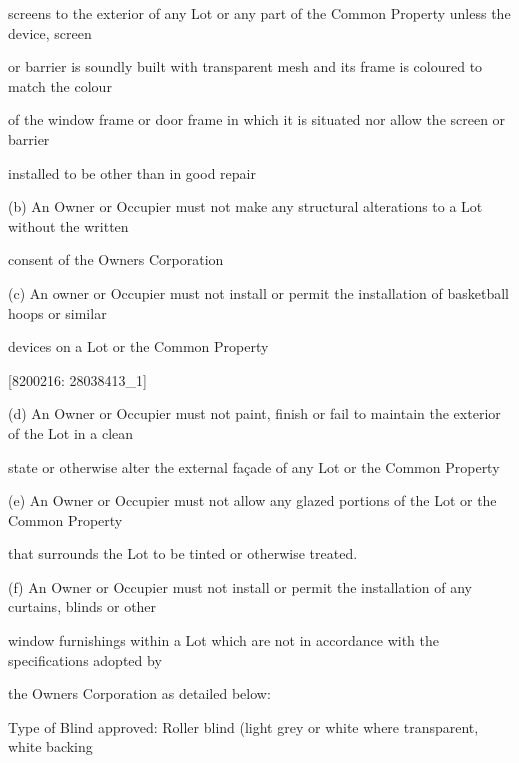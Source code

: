 \documentclass{article}
\begin{document}
{\fontsize{10.02}{1}screens to the exterior of any Lot or any part of the Common Property unless the device, screen }

{\fontsize{10.02}{1}or barrier is soundly built with transparent mesh and its frame is coloured to match the colour }

{\fontsize{10.02}{1}of the window frame or door frame in which it is situated nor allow the screen or barrier }

{\fontsize{10.02}{1}installed to be other than in good repair }

{\fontsize{9.962}{1}(b) An Owner or Occupier must not make any structural alterations to a Lot without the written }

{\fontsize{10.02}{1}consent of the Owners Corporation }

{\fontsize{9.962}{1}(c) An owner or Occupier must not install or permit the installation of basketball hoops or similar }

{\fontsize{10.02}{1}devices on a Lot or the Common Property }

\newpage
















{\fontsize{7.02}{1}[8200216: 28038413\_1] }

{\fontsize{9.962}{1}(d) An Owner or Occupier must not paint, finish or fail to maintain the exterior of the Lot in a clean }

{\fontsize{10.02}{1}state or otherwise alter the external façade of any Lot or the Common Property }

{\fontsize{9.962}{1}(e) An Owner or Occupier must not allow any glazed portions of the Lot or the Common Property }

{\fontsize{10.02}{1}that surrounds the Lot to be tinted or otherwise treated. }

{\fontsize{9.962}{1}(f) An Owner or Occupier must not install or permit the installation of any curtains, blinds or other }

{\fontsize{10.02}{1}window furnishings within a Lot which are not in accordance with the specifications adopted by }

{\fontsize{10.02}{1}the Owners Corporation as detailed below: }

{\fontsize{10.02}{1}Type of Blind approved: Roller blind (light grey or white where transparent, white backing }
\end{document}
